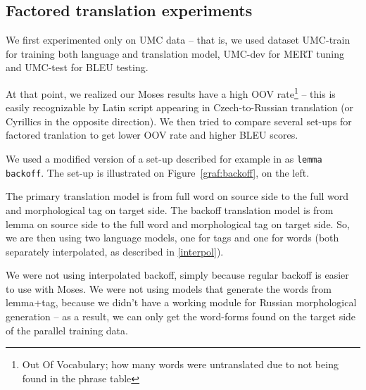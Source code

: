 \subsection{Factored translation experiments}
\label{factors}
We first experimented only on UMC data -- that is, we used dataset UMC-train for training both language and translation model, UMC-dev for MERT tuning and UMC-test for BLEU testing.

At that point, we realized our Moses results have a high OOV rate\footnote{Out Of Vocabulary; how many words were untranslated due to not being found in the phrase table} -- this is easily recognizable by Latin script appearing in Czech-to-Russian translation (or Cyrillics in the opposite direction). We then tried to compare several set-ups for factored tranlation to get lower OOV rate and higher BLEU scores.


We used a modified version of a set-up described for example in \cite{backoff} as \texttt{lemma backoff}. The set-up is illustrated on Figure~\ref{graf:backoff}, on the left.

The primary translation model is from full word on source side to the full word and morphological tag on target side. The backoff translation model is from lemma on source side to the full word and morphological tag on target side. So, we are then using two language models, one for tags and one for words (both separately interpolated, as described in \ref{interpol}).

We were not using interpolated backoff, simply because regular backoff is easier to use with Moses. We were not using models that generate the words from lemma+tag, because we didn't have a working module for Russian morphological generation -- as a result, we can only get the word-forms found on the target side of the parallel training data.





